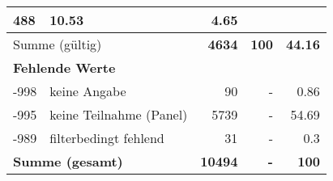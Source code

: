 \begin{longtable}{lXrrr}
       \num{488} &
       \num[round-mode=places,round-precision=2]{10,53} &
         \num[round-mode=places,round-precision=2]{4,65} \\
     \midrule
     \multicolumn{2}{l}{Summe (gültig)} &
       \textbf{\num{4634}} &
     \textbf{100} &
       \textbf{\num[round-mode=places,round-precision=2]{44,16}} \\
     \multicolumn{5}{l}{\textbf{Fehlende Werte}}\\
       -998 &
       keine Angabe &
         \num{90} &
        - &
         \num[round-mode=places,round-precision=2]{0,86} \\
       -995 &
       keine Teilnahme (Panel) &
         \num{5739} &
        - &
         \num[round-mode=places,round-precision=2]{54,69} \\
       -989 &
       filterbedingt fehlend &
         \num{31} &
        - &
         \num[round-mode=places,round-precision=2]{0,3} \\
     \midrule
     \multicolumn{2}{l}{\textbf{Summe (gesamt)}} &
          \textbf{\num{10494}} &
        \textbf{-} &
        \textbf{100} \\
     \bottomrule
     \end{longtable}
     

